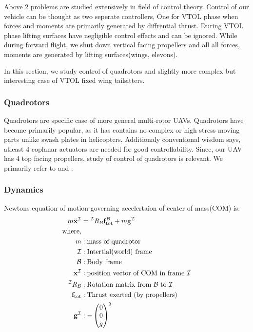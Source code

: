 Above 2 problems are studied extensively in field of control theory. Control of our vehicle can be thought as two seperate controllers, One for VTOL phase when forces and moments are primarily generated by diffrential thrust. During VTOL phase lifting surfaces have negligible control effects and can be ignored. While during forward flight, we shut down vertical facing propellers and all all forces, moments are generated by lifting surfaces(wings, elevons).

In this section, we study control of quadrotors and slightly more complex but interesting case of VTOL fixed wing tailsitters.

\subsubsection{Quadrotors}
Quadrotors are specific case of more general multi-rotor UAVs. Quadrotors have become primarily popular, as it has contains no complex or high stress moving parts unlike swash plates in helicopters. Additionaly conventional wisdom says, atleast 4 coplanar actuators are needed for good controllability. Since, our UAV has 4 top facing propellers, study of control of quadrotors is relevant. We primarily refer to \cite{mellinger2011minimum} and \cite{lee2010geometric}.

\subsubsection{Dynamics}

Newtons equation of motion governing accelertaion of center of mass(COM) is:
\begin{align*}
    m\ddot{\mathbf{x}}^\mathcal{I} &= \prescript{\mathcal{I}}{}R_{\mathcal{B}} \mathbf{f}^{\mathcal{B}}_{\text{tot}} + m\mathbf{g}^{\mathcal{I}} \\
    \text{where,}\\
    m&: \text{mass of quadrotor}\\
    \mathcal{I} &: \text{Intertial(world) frame}\\
    \mathcal{B} &: \text{Body frame}\\
    \mathbf{x}^\mathcal{I}&: \text{position vector of COM in frame } \mathcal{I}\\
    \prescript{\mathcal{I}}{}R_{\mathcal{B}}&: \text{Rotation matrix from }\mathcal{B} \text{ to }\mathcal{I}\\
    \mathbf{f}_{\text{tot}}&: \text{Thrust exerted (by propellers)}\\
    \mathbf{g}^{\mathcal{I}}&: -\begin{pmatrix}0\\0\\g\end{pmatrix}^\mathcal{I}
\end{align*}

